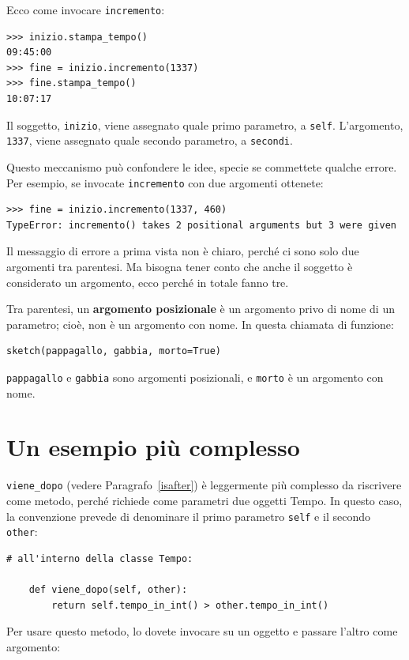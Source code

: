 \documentclass[10pt]{book}
\begin{document}
Ecco come invocare {\tt incremento}:

\begin{verbatim}
>>> inizio.stampa_tempo()
09:45:00
>>> fine = inizio.incremento(1337)
>>> fine.stampa_tempo()
10:07:17
\end{verbatim}
%
Il soggetto, {\tt inizio}, viene assegnato quale primo parametro, a
{\tt self}.  L'argomento, {\tt 1337}, viene assegnato quale secondo parametro, a {\tt secondi}.

Questo meccanismo può confondere le idee, specie se commettete qualche errore. Per esempio, se invocate {\tt incremento} con due argomenti ottenete:

\begin{verbatim}
>>> fine = inizio.incremento(1337, 460)
TypeError: incremento() takes 2 positional arguments but 3 were given
\end{verbatim}
%
Il messaggio di errore a prima vista non è chiaro, perché ci sono solo due argomenti tra parentesi. Ma bisogna tener conto che anche il soggetto è considerato un argomento, ecco perché in totale fanno tre.

Tra parentesi, un {\bf argomento posizionale} è un argomento privo di nome di un parametro; cioè, non è un argomento con nome. In questa chiamata di funzione:

\begin{verbatim}
sketch(pappagallo, gabbia, morto=True)
\end{verbatim}

{\tt pappagallo} e {\tt gabbia} sono argomenti posizionali, e {\tt morto} è un argomento con nome.


\section{Un esempio più complesso}

\verb"viene_dopo" (vedere Paragrafo~\ref{isafter}) è leggermente più complesso da riscrivere come metodo, perché richiede come parametri due oggetti Tempo. In questo caso, la convenzione prevede di denominare il primo parametro {\tt self} e il secondo {\tt other}:

\begin{verbatim}
# all'interno della classe Tempo:

    def viene_dopo(self, other):
        return self.tempo_in_int() > other.tempo_in_int()
\end{verbatim}
%
Per usare questo metodo, lo dovete invocare su un oggetto e passare l'altro come argomento:
\end{document}
